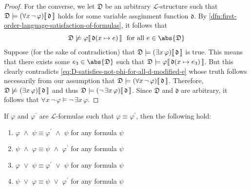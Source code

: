 \begin{proof}
    \vspace{0.3cm}
    \noindent
    For the converse, we let \( \mathfrak{D} \) be an arbitrary \( \mathcal{L} \)-structure such that
    \( \folwffsatisfaction{\mathfrak{D}}{\mleft( \forall x \, \lnot \, \varphi \mright)}{\mathfrak{d}} \) holds for some variable assginment
    function \( \mathfrak{d} \). By \cref{dfn:first-order-language-satisfaction-of-formulas}, it follows that
    \begin{equation}
        \label{eq:D-satisfies-not-phi-for-all-d-modified-e}
        \folwffnonsatisfaction{\mathfrak{D}}{\varphi}{ \folmodifiedvariableassignmentfunction{\mathfrak{d}}{x}{e} } \ \ \text{for all} \ e \in \abs{\mathfrak{D}}
    \end{equation}
    Suppose (for the sake of contradiction) that \( \folwffsatisfaction{\mathfrak{D}}{\mleft( \exists x \, \varphi \mright)}{\mathfrak{d}} \) is true.
    This means that there exists some \( e_{3} \in \abs{\mathfrak{D}} \) such that
    \( \folwffsatisfaction{\mathfrak{D}}{\varphi}{ \folmodifiedvariableassignmentfunction{\mathfrak{d}}{x}{e_{3}} } \).
    But this clearly contradicts \eqref{eq:D-satisfies-not-phi-for-all-d-modified-e} whose truth follows necessarily from our assumption that
    \( \folwffsatisfaction{\mathfrak{D}}{\mleft( \forall x \, \lnot \, \varphi \mright)}{\mathfrak{d}} \).
    Therefore, \( \folwffnonsatisfaction{\mathfrak{D}}{\mleft( \exists x \, \varphi \mright)}{\mathfrak{d}} \)
    and thus \( \folwffsatisfaction{\mathfrak{D}}{\mleft( \lnot \, \exists x \, \varphi \mright)}{\mathfrak{d}} \).
    Since \( \mathfrak{D} \) and \( \mathfrak{d} \) are arbitrary, it follows that \( \forall x \, \lnot \, \varphi \models \lnot \, \exists x \, \varphi \).
\end{proof}

\begin{thm}
     \label{logical-equivalence:replacing-logically-equivalent-conjuncts-or-disjuncts-yields-logically-equivalent-conjunctions-and-disjunctions}
    If \( \varphi \) and \( \varphi^{\prime} \) are \( \mathcal{L} \)-formulas such that \( \varphi \equiv \varphi^{\prime} \),
    then the following hold:
    \begin{enumerate}[topsep=2pt,label=\textup{\texttt{(\alph*)}}]
        \item \( \varphi \,\,{\land}\,\, \psi \equiv \varphi^{\prime} \,\,{\land}\,\, \psi \) for any formula \( \psi \)  \label{enum:conjunct1}
        \item \( \psi \,\,{\land}\,\, \varphi \equiv \psi \,\,{\land}\,\, \varphi^{\prime} \) for any formula \( \psi \) \label{enum:conjunct2}
        \item \( \varphi \,\,{\lor}\,\, \psi \equiv \varphi^{\prime} \,\,{\lor}\,\, \psi \) for any formula \( \psi \)  \label{enum:disjunct1}
        \item \( \psi \,\,{\lor}\,\, \varphi \equiv \psi \,\,{\lor}\,\, \varphi^{\prime} \) for any formula \( \psi \)  \label{enum:disjunct2}
    \end{enumerate}
\end{thm}

